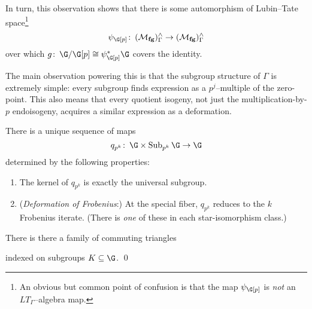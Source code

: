 \begin{center}
\end{center}








In turn, this observation shows that there is some automorphism of Lubin--Tate space\footnote{An obvious but common point of confusion is that the map $\psi_{\G[p]}$ is \emph{not} an $LT_\Gamma$--algebra map.} \[\psi_{\G[p]}\co (\moduli{fg})^\wedge_\Gamma \to (\moduli{fg})^\wedge_\Gamma\] over which $g\co \G/\G[p] \cong \psi_{\G[p]}^* \G$ covers the identity.

The main observation powering this is that the subgroup structure of $\Gamma$ is extremely simple: every subgroup finds expression as a $p^j$--multiple of the zero-point.  This also means that every quotient isogeny, not just the multiplication-by-$p$ endoisogeny, acquires a similar expression as a deformation.

\begin{lemma}
There is a unique sequence of maps \[q_{p^k}\co \G \times \Sub_{p^k} \G \to \G\] determined by the following properties:
\begin{enumerate}
    \item The kernel of $q_{p^k}$ is exactly the universal subgroup.
    \item (\textit{Deformation of Frobenius}:) At the special fiber, $q_{p^k}$ reduces to the $k${\th} Frobenius iterate.  (There is \emph{one} of these in each star-isomorphism class.)
    \qedhere
\end{enumerate}
\end{lemma}

\begin{corollary}
There is there a family of commuting triangles
\begin{center}
\end{center}
indexed on subgroups $K \subseteq \G$. \qed
\end{corollary}



